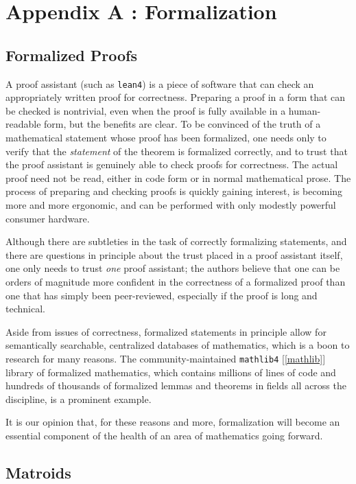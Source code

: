\documentclass{amsart}
\theoremstyle{plain}
\theoremstyle{definition}
\newcommand{\smalltt}[1]{{\small\texttt{#1}}}
\begin{document}
\section*{Appendix A : Formalization}

\subsection*{Formalized Proofs}
A proof assistant (such as \smalltt{lean4}) is a piece of software 
that can check an appropriately written proof for correctness. 
Preparing a proof in a form that can be checked is nontrivial, 
even when the proof is fully available in a human-readable form,
but the benefits are clear. To be convinced of the truth of 
a mathematical statement whose proof has been formalized, 
one needs only to verify that the \emph{statement}
of the theorem is formalized correctly, and to trust that the proof 
assistant is genuinely able to check proofs for correctness. 
The actual proof need not be read, either in code
form or in normal mathematical prose. 
The process of preparing and checking proofs is quickly gaining
interest, is becoming more and more ergonomic,
and can be performed with only modestly powerful consumer hardware. 

Although there are subtleties in the task of correctly formalizing
statements, and there are questions in principle about the trust
placed in a proof assistant itself, one only needs to trust \emph{one}
proof assistant; the authors believe that one can be orders of magnitude 
more confident in the correctness of a formalized proof than one
that has simply been peer-reviewed, especially if the proof is long 
and technical. 

Aside from issues of correctness, formalized statements in principle
allow for semantically searchable, centralized databases of mathematics, 
which is a boon to research for many reasons. The community-maintained 
\smalltt{mathlib4} [\ref{mathlib}]
library of formalized mathematics, which contains millions of lines of 
code and hundreds of thousands of formalized lemmas and theorems
in fields all across the discipline, is a prominent example. 

It is our opinion that, for these reasons and more,
formalization will become an essential component of the health of 
an area of mathematics going forward. 

\subsection*{Matroids}
\end{document}

